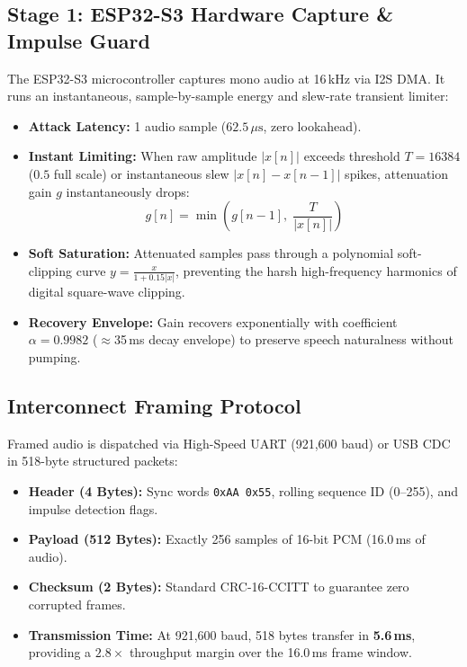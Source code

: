 \documentclass[11pt,a4paper]{article}
\begin{document}
\subsection{Stage 1: ESP32-S3 Hardware Capture \& Impulse Guard}
The ESP32-S3 microcontroller captures mono audio at 16\,kHz via I2S DMA. It runs an instantaneous, sample-by-sample energy and slew-rate transient limiter:
\begin{itemize}
    \item \textbf{Attack Latency:} 1 audio sample ($62.5\,\mu\text{s}$, zero lookahead).
    \item \textbf{Instant Limiting:} When raw amplitude $|x[n]|$ exceeds threshold $T = 16384$ ($0.5$ full scale) or instantaneous slew $|x[n] - x[n-1]|$ spikes, attenuation gain $g$ instantaneously drops:
    \begin{equation}
        g[n] = \min\left(g[n-1], \; \frac{T}{|x[n]|}\right)
    \end{equation}
    \item \textbf{Soft Saturation:} Attenuated samples pass through a polynomial soft-clipping curve $y = \frac{x}{1 + 0.15|x|}$, preventing the harsh high-frequency harmonics of digital square-wave clipping.
    \item \textbf{Recovery Envelope:} Gain recovers exponentially with coefficient $\alpha = 0.9982$ ($\approx$35\,ms decay envelope) to preserve speech naturalness without pumping.
\end{itemize}

\subsection{Interconnect Framing Protocol}
Framed audio is dispatched via High-Speed UART (921,600 baud) or USB CDC in 518-byte structured packets:
\begin{itemize}
    \item \textbf{Header (4 Bytes):} Sync words \texttt{0xAA 0x55}, rolling sequence ID (0--255), and impulse detection flags.
    \item \textbf{Payload (512 Bytes):} Exactly 256 samples of 16-bit PCM (16.0\,ms of audio).
    \item \textbf{Checksum (2 Bytes):} Standard CRC-16-CCITT to guarantee zero corrupted frames.
    \item \textbf{Transmission Time:} At 921,600 baud, 518 bytes transfer in \textbf{5.6\,ms}, providing a $2.8\times$ throughput margin over the 16.0\,ms frame window.
\end{itemize}
\end{document}

